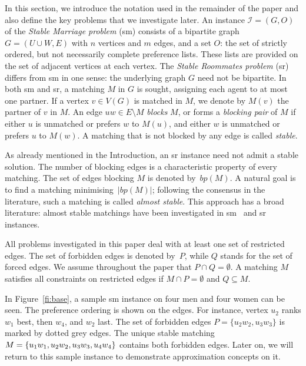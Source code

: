 \documentclass[preprint,12pt]{elsarticle}
\begin{document}
In this section, we introduce the notation used in the remainder of the paper and also define the key problems that we investigate later. An instance $\mathcal{I} =(G, O)$ of the \emph{Stable Marriage problem} ({\sc sm}) consists of a bipartite graph $G =(U \cup W, E)$ with $n$ vertices and $m$ edges, and a set $O$: the set of strictly ordered, but not necessarily complete preference lists. These lists are provided on the set of adjacent vertices at each vertex. The \emph{Stable Roommates problem} ({\sc sr}) differs from {\sc sm} in one sense: the underlying graph $G$ need not be bipartite. In both {\sc sm} and {\sc sr}, a matching $M$ in $G$ is sought, assigning each agent to at most one partner. If a vertex $v\in V(G)$ is matched in $M$, we denote by $M(v)$ the partner of $v$ in $M$.  An edge $uw \in E \setminus M$ \emph{blocks} $M$, or forms a \emph{blocking pair} of $M$ if either $u$ is unmatched or prefers $w$ to $M(u)$, and either $w$ is unmatched or prefers $u$ to $M(w)$. A matching that is not blocked by any edge is called \emph{stable}.

As already mentioned in the Introduction, an {\sc sr} instance need not admit a stable solution. The number of blocking edges is a characteristic property of every matching. The set of edges blocking $M$ is denoted by~$bp(M)$. A natural goal is to find a matching minimising~$|bp(M)|$;
following the consensus in the literature, such a matching is called \emph{almost stable}. This approach has a broad literature: almost stable matchings have been investigated in {\sc sm}~\cite{KMV94,HIM09,BMM10} and {\sc sr}~\cite{ABM06,BMM12} instances.

All problems investigated in this paper deal with at least one set of restricted edges. The set of forbidden edges is denoted by~$P$, while $Q$ stands for the set of forced edges. We assume throughout the paper that $P \cap Q = \emptyset$. A matching $M$ satisfies all constraints on restricted edges if $M \cap P = \emptyset$ and $Q \subseteq M$.

In Figure~\ref{fi:base}, a sample {\sc sm} instance on four men and four women can be seen. The preference ordering is shown on the edges. For instance, vertex $u_2$ ranks $w_1$ best, then $w_4$, and $w_2$ last. The set of forbidden edges $P = \{ u_2w_2, u_3w_3\}$ is marked by dotted grey edges. The unique stable matching $M = \{u_1w_1, u_2w_2, \linebreak[0] u_3w_3, u_4w_4\}$ contains both forbidden edges. Later on, we will return to this sample instance to demonstrate approximation concepts on it.
\end{document}
